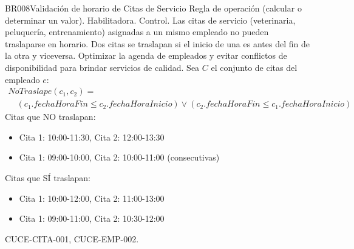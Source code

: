 \begin{BussinesRule}{BR008}{Validación de horario de Citas de Servicio}
	\BRitem[Tipo:] Regla de operación (calcular o determinar un valor).
	\BRitem[Clase:] Habilitadora.
	\BRitem[Nivel:] Control.
	\BRitem[Descripción:] Las citas de servicio (veterinaria, peluquería, entrenamiento) asignadas a un mismo empleado no pueden traslaparse en horario. Dos citas se traslapan si el inicio de una es antes del fin de la otra y viceversa.
	\BRitem[Motivación:] Optimizar la agenda de empleados y evitar conflictos de disponibilidad para brindar servicios de calidad.
	\BRitem[Sentencia:] Sea $C$ el conjunto de citas del empleado $e$:
		\begin{displaymath}
			\begin{array}{l}
			NoTraslape(c_1, c_2) = \\
			\quad (c_1.fechaHoraFin \leq c_2.fechaHoraInicio) \lor (c_2.fechaHoraFin \leq c_1.fechaHoraInicio)
			\end{array}
		\end{displaymath}
	 Citas que NO traslapan:
		\begin{itemize}
			\item Cita 1: 10:00-11:30, Cita 2: 12:00-13:30
			\item Cita 1: 09:00-10:00, Cita 2: 10:00-11:00 (consecutivas)
		\end{itemize}
	 Citas que SÍ traslapan:
		\begin{itemize}
			\item Cita 1: 10:00-12:00, Cita 2: 11:00-13:00
			\item Cita 1: 09:00-11:00, Cita 2: 10:30-12:00
		\end{itemize}
	 CUCE-CITA-001, CUCE-EMP-002.
\end{BussinesRule}

